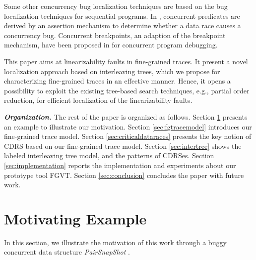 \documentclass[runningheads]{llncs}
\begin{document}
Some other concurrency bug localization techniques are based on the bug localization techniques for sequential programs. In \cite{DBLP:conf/IEEEpact/GottschlichPPW13}, concurrent predicates are derived by an assertion mechanism to determine whether a data race causes a concurrency bug. Concurrent breakpoints, an adaption of the breakpoint mechanism, have been proposed in \cite{DBLP:conf/ppopp/ParkS12} for concurrent program debugging.

This paper aims at linearizability faults in fine-grained traces. It present a novel localization approach based on interleaving trees, which we propose for characterizing fine-grained traces in an effective manner. Hence, it opens a possibility to exploit the existing tree-based search techniques, e.g., partial order reduction, for efficient localization of the linearizability faults.


\noindent\textbf{\textit{Organization.}} The rest of the paper is organized as follows. Section \ref{sec:motivatingeg} presents an example to illustrate our motivation. Section \ref{sec:fgtracemodel} introduces our fine-grained trace model. Section \ref{sec:criticaldataraces} presents the key notion of CDRS based on our fine-grained trace model. Section \ref{sec:intertree} shows the labeled interleaving tree model, and the patterns of CDRSes. Section \ref{sec:implementation} reports the implementation and experiments about our prototype tool FGVT. Section \ref{sec:conclusion} concludes the paper with future work.

\vspace{-0.2cm}

\section{Motivating Example}\label{sec:motivatingeg}







In this section, we illustrate the motivation of this work through a buggy concurrent data structure \textit{PairSnapShot} \cite{DBLP:conf/sac/LongZ16}.
\end{document}
